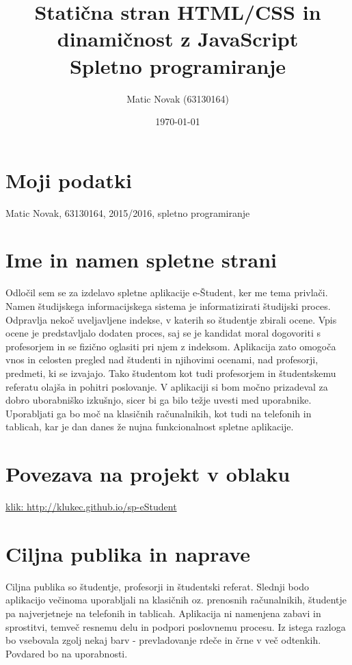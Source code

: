 \documentclass[a4paper,11pt]{article}
\title{Statična stran HTML/CSS in dinamičnost z JavaScript \\ Spletno programiranje}
\author{Matic Novak (63130164)}
\date{\today}
\begin{document}
\maketitle

\section{Moji podatki}

Matic Novak, 63130164, 2015/2016, spletno programiranje

\section{Ime in namen spletne strani}

Odločil sem se za izdelavo spletne aplikacije e-Študent, ker me tema privlači. Namen študijskega informacijskega sistema je informatizirati študijski proces. Odpravlja nekoč uveljavljene indekse, v katerih so študentje zbirali ocene. Vpis ocene je predstavljalo dodaten proces, saj se je kandidat moral dogovoriti s profesorjem in se fizično oglasiti pri njem z indeksom. Aplikacija zato omogoča vnos in celosten pregled nad študenti in njihovimi ocenami, nad profesorji, predmeti, ki se izvajajo. Tako študentom kot tudi profesorjem in študentskemu referatu olajša in pohitri poslovanje. V aplikaciji si bom močno prizadeval za dobro uborabniško izkušnjo, sicer bi ga bilo težje uvesti med uporabnike. Uporabljati ga bo moč na klasičnih računalnikih, kot tudi na telefonih in tablicah, kar je dan danes že nujna funkcionalnost spletne aplikacije.

\section{Povezava na projekt v oblaku}
\href{http://klukec.github.io/sp-eStudent}{klik: http://klukec.github.io/sp-eStudent}

\section{Ciljna publika in naprave}

Ciljna publika so študentje, profesorji in študentski referat. Slednji bodo aplikacijo večinoma uporabljali na klasičnih oz. prenosnih računalnikih, študentje pa najverjetneje na telefonih in tablicah. Aplikacija ni namenjena zabavi in sprostitvi, temveč resnemu delu in podpori poslovnemu procesu. Iz istega razloga bo vsebovala zgolj nekaj barv - prevladovanje rdeče in črne v več odtenkih. Povdared bo na uporabnosti.
\end{document}
